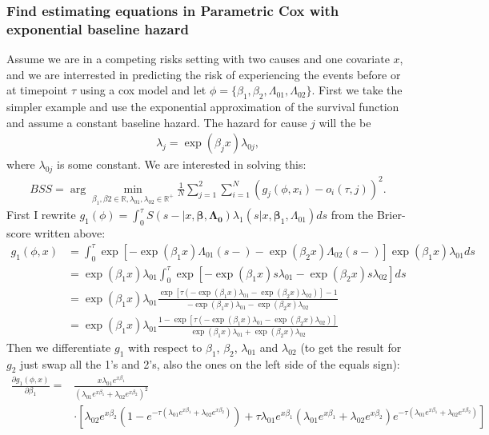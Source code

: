 \documentclass[11pt]{article}
\begin{document}
\subsubsection{Find estimating equations in Parametric Cox with exponential baseline hazard}
\label{sec:orge024b95}
Assume we are in a competing risks setting with two causes and one covariate \(x\), and we are interrested in predicting the risk of experiencing the events before or at timepoint \(\tau\) using a cox model and let \(\phi = \{\beta_1,\beta_2,\Lambda_{01},\Lambda_{02}\}\). First we take the simpler example and use the exponential approximation of the survival function and assume a constant baseline hazard. The hazard for cause \(j\) will the be
\begin{align*}
\lambda_j = \exp(\beta_jx)\lambda_{0j},
\end{align*}
where \(\lambda_{0j}\) is some constant. We are interested in solving this:
\begin{align*}
BSS=\arg\min_{\beta_1,\beta2\in\mathbb{R},\lambda_{01},\lambda_{02}\in\mathbb{R}^+}\frac{1}{N}\sum_{j = 1}^2\sum_{i = 1}^N\left(g_j(\phi,x_i)-o_i(\tau,j)\right)^2.
\end{align*}
First I rewrite \(g_1(\phi) = \int_0^{\tau} S(s-|x,\boldsymbol{\beta},\boldsymbol{\Lambda_0})\lambda_1(s|x,\boldsymbol{\beta}_1,\Lambda_{01})ds\) from the Brier-score written above:
\begin{align*}
g_1(\phi,x)&= \int_0^{\tau}\exp\left[-\exp(\beta_1x)\Lambda_{01}(s-)-\exp(\beta_2x)\Lambda_{02}(s-)\right]\exp(\beta_1x)\lambda_{01}ds\\
&=\exp(\beta_1x)\lambda_{01}\int_0^{\tau}\exp\left[-\exp(\beta_1x)s\lambda_{01}-\exp(\beta_2x)s\lambda_{02}\right]ds\\
&=\exp(\beta_1x)\lambda_{01}\frac{\exp\left[\tau(-\exp(\beta_1x)\lambda_{01}-\exp(\beta_2x)\lambda_{02})\right]-1}{-\exp(\beta_1x)\lambda_{01}-\exp(\beta_2x)\lambda_{02}}\\
&=\exp(\beta_1x)\lambda_{01}\frac{1-\exp\left[\tau(-\exp(\beta_1x)\lambda_{01}-\exp(\beta_2x)\lambda_{02})\right]}{\exp(\beta_1x)\lambda_{01}+\exp(\beta_2x)\lambda_{02}}
\end{align*}
Then we differentiate \(g_1\) with respect to \(\beta_1\), \(\beta_2\), \(\lambda_{01}\) and \(\lambda_{02}\) (to get the result for \(g_2\) just swap all the 1's and 2's, also the ones on the left side of the equals sign):
\begin{align*}
\frac{\partial g_1(\phi,x)}{\partial\beta_1} = &\frac{x \lambda_{01} e^{x \beta_1}}{\left(\lambda_{01} e^{x \beta_1} + \lambda_{02} e^{x \beta_2}\right)^2}\\
&\cdot\left[
\lambda_{02} e^{x \beta_2}\left(1 - e^{-\tau\left(\lambda_{01} e^{x \beta_1} + \lambda_{02} e^{x \beta_2}\right)}\right)
+ \tau \lambda_{01} e^{x \beta_1}\left(\lambda_{01} e^{x \beta_1} + \lambda_{02} e^{x \beta_2}\right)e^{-\tau\left(\lambda_{01} e^{x \beta_1} + \lambda_{02} e^{x \beta_2}\right)}
\right]
\end{align*}
\end{document}

